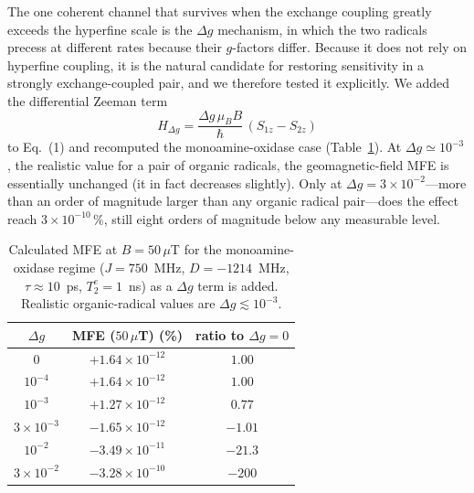 \documentclass[11pt]{article}
\begin{document}
The one coherent channel that survives when the exchange coupling greatly exceeds
the hyperfine scale is the $\Delta g$ mechanism, in which the two radicals precess
at different rates because their $g$-factors differ. Because it does not rely on
hyperfine coupling, it is the natural candidate for restoring sensitivity in a
strongly exchange-coupled pair, and we therefore tested it explicitly. We added
the differential Zeeman term
\begin{equation}
H_{\Delta g} = \frac{\Delta g\,\mu_B B}{\hbar}\,(S_{1z} - S_{2z})
\end{equation}
to Eq.~(1) and recomputed the monoamine-oxidase case
(Table~\ref{tab:dg}). At $\Delta g \simeq 10^{-3}$, the realistic value for a pair
of organic radicals, the geomagnetic-field MFE is essentially unchanged (it in
fact decreases slightly). Only at $\Delta g = 3\times10^{-2}$---more than an order
of magnitude larger than any organic radical pair---does the effect reach
$3\times10^{-10}\,\%$, still eight orders of magnitude below any measurable level.

\begin{table}[h]
\centering
\caption{Calculated MFE at $B = 50\,\mu$T for the monoamine-oxidase regime
($J = 750$~MHz, $D = -1214$~MHz, $\tau\approx10$~ps, $T_2^e = 1$~ns) as a
$\Delta g$ term is added. Realistic organic-radical values are
$\Delta g \lesssim 10^{-3}$.}
\label{tab:dg}
\begin{tabular}{c c c}
\toprule
$\Delta g$ & MFE ($50\,\mu$T) (\%) & ratio to $\Delta g = 0$ \\
\midrule
$0$                & $+1.64\times10^{-12}$ & $1.00$ \\
$10^{-4}$          & $+1.64\times10^{-12}$ & $1.00$ \\
$10^{-3}$          & $+1.27\times10^{-12}$ & $0.77$ \\
$3\times10^{-3}$   & $-1.65\times10^{-12}$ & $-1.01$ \\
$10^{-2}$          & $-3.49\times10^{-11}$ & $-21.3$ \\
$3\times10^{-2}$   & $-3.28\times10^{-10}$ & $-200$ \\
\bottomrule
\end{tabular}
\end{table}
\end{document}
